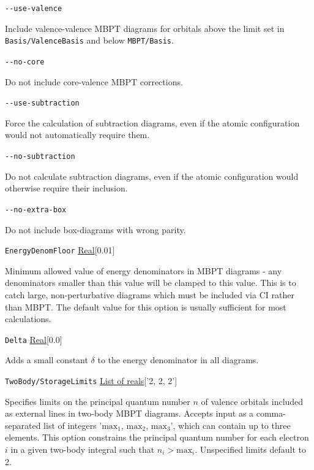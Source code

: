 \documentclass{report}
\begin{document}
\texttt{{-}{-}use-valence}
\begin{adjustwidth}{1cm}{}
Include valence-valence MBPT diagrams for orbitals above the limit set in \texttt{Basis/ValenceBasis} 
and below \texttt{MBPT/Basis}.
\end{adjustwidth}

\texttt{{-}{-}no-core}
\begin{adjustwidth}{1cm}{}
Do not include core-valence MBPT corrections.
\end{adjustwidth}

\texttt{{-}{-}use-subtraction}
\begin{adjustwidth}{1cm}{}
Force the calculation of subtraction diagrams, even if the atomic configuration would not automatically
require them.
\end{adjustwidth}

\texttt{{-}{-}no-subtraction}
\begin{adjustwidth}{1cm}{}
Do not calculate subtraction diagrams, even if the atomic configuration would otherwise require their
inclusion.
\end{adjustwidth}

\texttt{{-}{-}no-extra-box}
\begin{adjustwidth}{1cm}{}
Do not include box-diagrams with wrong parity.
\end{adjustwidth}

\texttt{EnergyDenomFloor} \uline{Real}[0.01]
\begin{adjustwidth}{1cm}{}
Minimum allowed value of energy denominators in MBPT diagrams - any denominators smaller than this value
will be clamped to this value. This is to catch large, non-perturbative diagrams which must be
included via CI rather than MBPT. The default value for this option is usually sufficient for most 
calculations.
\end{adjustwidth}

\texttt{Delta} \uline{Real}[0.0]
\begin{adjustwidth}{1cm}{}
Adds a small constant $\delta$ to the energy denominator in all diagrams.
\end{adjustwidth}

\texttt{TwoBody/StorageLimits} \uline{List of reals}['2, 2, 2']
\begin{adjustwidth}{1cm}{}
Specifies limits on the principal quantum number $n$ of
valence orbitals included as external lines in two-body MBPT diagrams. Accepts input as a 
comma-separated list of integers '$\mathrm{max}_1$, $\mathrm{max}_2$, $\mathrm{max}_3$', which can 
contain up to three elements. This option constrains the principal quantum number for each electron $i$ 
in a given two-body integral such that $n_i > \mathrm{max}_i$. Unspecified limits default to 2.
\end{adjustwidth}
\end{document}
